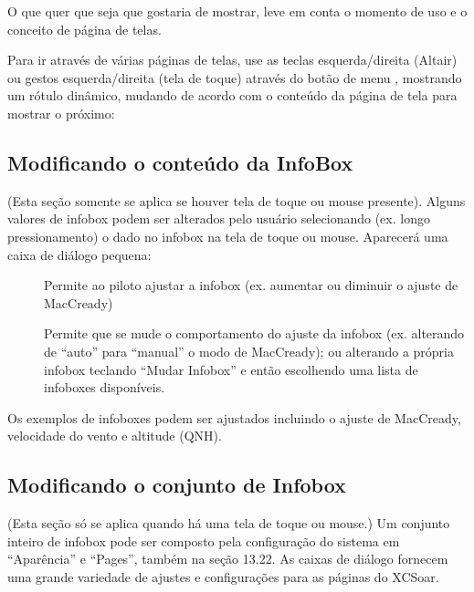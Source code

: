 O que quer que seja que gostaria de mostrar, leve em conta o momento de uso e o conceito de página de telas.

Para ir através de várias páginas de telas, use as teclas esquerda/direita (Altair) ou gestos esquerda/direita (tela de toque) através do botão de menu , mostrando um rótulo dinâmico, mudando de acordo com o conteúdo da página de tela para mostrar o próximo:

\blink{}\blink{}\blink{}\blink{}


\subsection*{Modificando o conteúdo da InfoBox }

(Esta seção somente se aplica se houver tela de toque ou mouse presente).  Alguns valores de infobox podem ser alterados pelo usuário selecionando (ex. longo pressionamento) o dado no infobox na tela de toque ou mouse.  Aparecerá uma caixa de diálogo pequena:

\begin{description}
\item[]  
Permite ao piloto ajustar a infobox (ex. aumentar ou diminuir o ajuste de MacCready)

\item[]
 Permite que se mude o comportamento do ajuste da infobox (ex. alterando de “auto” para “manual” o modo de MacCready); ou alterando a própria infobox teclando “Mudar Infobox” e então escolhendo uma lista de infoboxes disponíveis.

\end{description}

Os exemplos de infoboxes podem ser ajustados incluindo o ajuste de MacCready, velocidade do vento e altitude (QNH).


\subsection*{Modificando o conjunto de Infobox}

(Esta seção só se aplica quando há uma tela de toque ou mouse.)
Um conjunto inteiro de infobox pode ser composto pela configuração do sistema em “Aparência” e “Pages”, também na seção 13.22.  As caixas de diálogo fornecem uma grande variedade de ajustes e configurações para as páginas do XCSoar.


